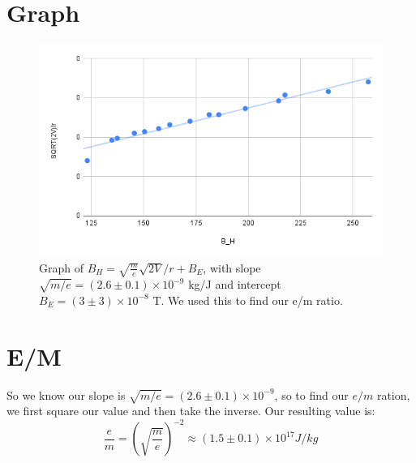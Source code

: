 \documentclass[12pt]{article}
\begin{document}
\section{Graph}
\begin{figure}[H]
    \centering
    \includegraphics[width=\textwidth]{chart.png}
    \caption{Graph of $B_H = \sqrt{\frac{m}{e}}\sqrt{2V}/r + B_E$, with slope $\sqrt{m/e} = (2.6 \pm 0.1) \times 10^{-9}$ kg/J and intercept $B_E = (3 \pm 3) \times 10^{-8}$ T.
        We used this to find our e/m ratio.}
    \label{fig:bh_vs_sqrt2v_r}
\end{figure}
\section{E/M}
So we know our slope is $\sqrt{m/e} = (2.6 \pm 0.1) \times 10^{-9}$, so to find our $e/m$ ration,
we first square our value and then take the inverse. Our resulting value is:
\begin{equation*}
    \frac{e}{m} = \left(\sqrt{\frac{m}{e}}\right)^{-2}\approx (1.5 \pm 0.1) \times 10^{17} J/kg
\end{equation*}
\end{document}
